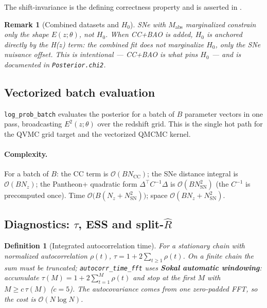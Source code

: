 \documentclass[11pt]{article}
\newtheorem{definition}{Definition}[section]
\newtheorem{remark}{Remark}[section]
\newcommand{\Ez}{E(z;\theta)}
\newcommand{\Ezsq}{E^2(z;\theta)}
\newcommand{\code}[1]{\texttt{#1}}
\newcommand{\bigO}{\mathcal{O}}
\newcommand{\Rhat}{\hat{R}}
\begin{document}
The shift-invariance is the defining correctness property and is asserted in
\code{}.

\begin{remark}[Combined datasets and $H_0$]
SNe with $M_{\mathrm{abs}}$ marginalized constrain only the \emph{shape}
$\Ez$, not $H_0$. When CC+BAO is added, $H_0$ is anchored \emph{directly} by
the H($z$) term: the combined fit does not marginalize $H_0$, only the SNe
nuisance offset. This is intentional --- CC+BAO is what pins $H_0$ --- and is
documented in \code{Posterior.chi2}.
\end{remark}

\subsection{Vectorized batch evaluation}

\code{log\_prob\_batch} evaluates the posterior for a batch of $B$ parameter
vectors in one pass, broadcasting $\Ezsq$ over the redshift grid. This is the
single hot path for the QVMC grid target and the vectorized QMCMC kernel.

\paragraph{Complexity.}
For a batch of $B$: the CC term is $\bigO(B N_{\mathrm{CC}})$; the SNe distance
integral is $\bigO(B N_z)$; the Pantheon+ quadratic form $\Delta^\top
C^{-1}\Delta$ is $\bigO(B N_{\mathrm{SN}}^2)$ (the $C^{-1}$ is precomputed
once). Time $\bigO\!\big(B(N_z+N_{\mathrm{SN}}^2)\big)$; space
$\bigO(B N_z + N_{\mathrm{SN}}^2)$.

\subsection{Diagnostics: $\tau$, ESS and split-$\Rhat$}

\begin{definition}[Integrated autocorrelation time]
For a stationary chain with normalized autocorrelation $\rho(t)$,
$\tau = 1 + 2\sum_{t\ge1}\rho(t)$. On a finite chain the sum must be truncated;
\code{autocorr\_time\_fft} uses \textbf{Sokal automatic windowing}: accumulate
$\tau(M)=1+2\sum_{t=1}^{M}\rho(t)$ and stop at the first $M$ with $M\ge c\,
\tau(M)$ ($c=5$). The autocovariance comes from one zero-padded FFT, so the
cost is $\bigO(N\log N)$.
\end{definition}
\end{document}
